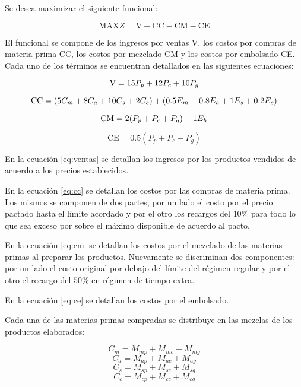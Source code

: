 \documentclass[a4paper,11pt]{article}
\begin{document}
Se desea maximizar el siguiente funcional:

\[
  \text{MAX} Z = \text{V} - \text{CC} - \text{CM} - \text{CE}
\]

El funcional se compone de los ingresos por ventas V, los costos por compras de
materia prima CC, los costos por mezclado CM y los costos por embolsado CE.
Cada uno de los términos se encuentran detallados en las siguientes ecuaciones:

\begin{equation}\label{eq:ventas}
  \text{V} = 15 P_p + 12 P_c + 10 P_g \\
\end{equation}

\begin{equation}\label{eq:cc}
  \text{CC} = (5 C_m + 8 C_a + 10 C_s + 2 C_c) + (0.5 E_m + 0.8 E_a + 1 E_s + 0.2 E_c) \\
\end{equation}

\begin{equation}\label{eq:cm}
  \text{CM} = 2 (P_p + P_c + P_g) + 1 E_h \\
\end{equation}

\begin{equation}\label{eq:ce}
  \text{CE} = 0.5 (P_p + P_c + P_g)
\end{equation}

En la ecuación \ref{eq:ventas} se detallan los ingresos por los productos
vendidos de acuerdo a los precios establecidos.

En la ecuación \ref{eq:cc} se detallan los costos por las compras de materia
prima. Los mismos se componen de dos partes, por un lado el costo por el precio
pactado hasta el límite acordado y por el otro los recargos del \(10\%\) para
todo lo que sea exceso por sobre el máximo disponible de acuerdo al pacto.

En la ecuación \ref{eq:cm} se detallan los costos por el mezclado de las
materias primas al preparar los productos. Nuevamente se discriminan dos
componentes: por un lado el costo original por debajo del límite del régimen
regular y por el otro el recargo del \(50\%\) en régimen de tiempo extra.

En la ecuación \ref{eq:ce} se detallan los costos por el embolsado.

Cada una de las materias primas compradas se distribuye en las mezclas de los
productos elaborados:

\[
  C_m = M_{mp} + M_{mc} + M_{mg}
\]
\[
  C_a = M_{ap} + M_{ac} + M_{ag}
\]
\[
  C_s = M_{sp} + M_{sc} + M_{sg}
\]
\[
  C_c = M_{cp} + M_{cc} + M_{cg}
\]
\end{document}
